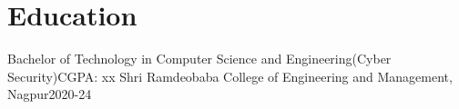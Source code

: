 \section{\textbf{Education}}
  \resumeSubHeadingListStart
    \resumeSubheading
      {Bachelor of Technology in Computer Science and Engineering(Cyber Security)}{CGPA: xx}
      {Shri Ramdeobaba College of Engineering and Management, Nagpur}{2020-24}
  \resumeSubHeadingListEnd